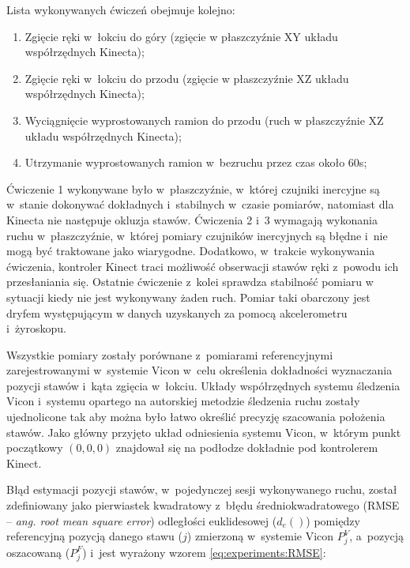 Lista wykonywanych ćwiczeń obejmuje kolejno:
\begin{enumerate}
	\item Zgięcie ręki w~łokciu do góry (zgięcie w płaszczyźnie XY układu współrzędnych Kinecta); \\
	\item Zgięcie ręki w~łokciu do przodu (zgięcie w płaszczyźnie XZ układu współrzędnych Kinecta); \\
	\item Wyciągnięcie wyprostowanych ramion do przodu (ruch w płaszczyźnie XZ układu współrzędnych Kinecta); \\
	\item Utrzymanie wyprostowanych ramion w~bezruchu przez czas około 60s; \\
\end{enumerate}
						
Ćwiczenie 1 wykonywane było w~płaszczyźnie, w~której czujniki inercyjne są w~stanie dokonywać dokładnych i~stabilnych w~czasie pomiarów, natomiast dla Kinecta nie następuje okluzja stawów. Ćwiczenia 2 i~3 wymagają wykonania ruchu w~płaszczyźnie, w~której pomiary czujników inercyjnych są błędne i~nie mogą być traktowane jako wiarygodne. Dodatkowo, w~trakcie wykonywania ćwiczenia, kontroler Kinect traci możliwość obserwacji stawów ręki z~powodu ich przesłaniania się. Ostatnie ćwiczenie z~kolei sprawdza stabilność pomiaru w sytuacji kiedy nie jest wykonywany żaden ruch. Pomiar taki obarczony jest dryfem występującym w danych uzyskanych za pomocą akcelerometru i~żyroskopu.
						
Wszystkie pomiary zostały porównane z~pomiarami referencyjnymi zarejestrowanymi w~systemie Vicon w~celu określenia dokładności wyznaczania pozycji stawów i~kąta zgięcia w~łokciu. Układy współrzędnych systemu śledzenia Vicon i~systemu opartego na autorskiej metodzie śledzenia ruchu zostały ujednolicone tak aby można było łatwo określić precyzję szacowania położenia stawów. Jako główny przyjęto układ odniesienia systemu Vicon, w~którym punkt początkowy $(0,0,0)$ znajdował się na podłodze dokładnie pod kontrolerem Kinect.
						
Błąd estymacji pozycji stawów, w~pojedynczej sesji wykonywanego ruchu, został zdefiniowany jako pierwiastek kwadratowy z~błędu średniokwadratowego (RMSE -- \emph{ang. root mean square error}) odległości euklidesowej ($d_e()$) pomiędzy referencyjną pozycją danego stawu ($j$) zmierzoną w~systemie Vicon $P^V_j$, a~pozycją oszacowaną ($P^F_j$) i~jest wyrażony wzorem \ref{eq:experiments:RMSE}:

